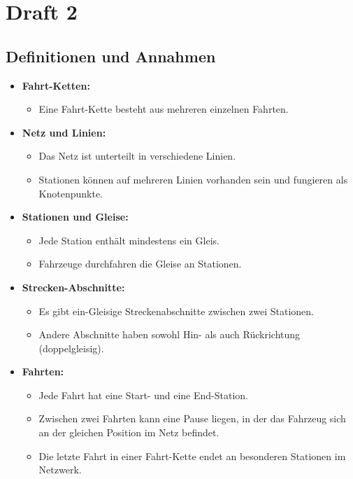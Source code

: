 
\section{Draft 2}
\subsection*{Definitionen und Annahmen}

\begin{itemize}
    \item \textbf{Fahrt-Ketten:}
    \begin{itemize}
        \item Eine Fahrt-Kette besteht aus mehreren einzelnen Fahrten.
    \end{itemize}
    
    \item \textbf{Netz und Linien:}
    \begin{itemize}
        \item Das Netz ist unterteilt in verschiedene Linien.
        \item Stationen können auf mehreren Linien vorhanden sein und fungieren als Knotenpunkte.
    \end{itemize}
    
    \item \textbf{Stationen und Gleise:}
    \begin{itemize}
        \item Jede Station enthält mindestens ein Gleis.
        \item Fahrzeuge durchfahren die Gleise an Stationen.
    \end{itemize}
    
    \item \textbf{Strecken-Abschnitte:}
    \begin{itemize}
        \item Es gibt ein-Gleisige Streckenabschnitte zwischen zwei Stationen.
        \item Andere Abschnitte haben sowohl Hin- als auch Rückrichtung (doppelgleisig).
    \end{itemize}
    
    \item \textbf{Fahrten:}
    \begin{itemize}
        \item Jede Fahrt hat eine Start- und eine End-Station.
        \item Zwischen zwei Fahrten kann eine Pause liegen, in der das Fahrzeug sich an der gleichen Position im Netz befindet.
        \item Die letzte Fahrt in einer Fahrt-Kette endet an besonderen Stationen im Netzwerk.
    \end{itemize}
    

\end{itemize}
